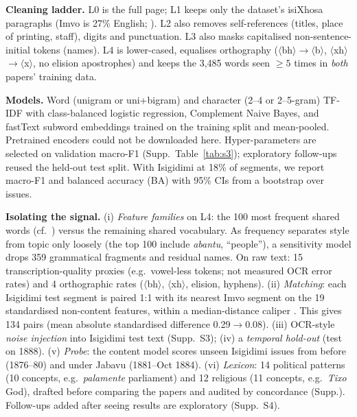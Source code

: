 \documentclass[10pt,letterpaper]{article}
\newcommand{\grapheme}[1]{$\langle$#1$\rangle$}
\begin{document}
 \textbf{Cleaning ladder.} L0 is the full page; L1 keeps only the dataset's isiXhosa paragraphs (Imvo is 27\% English; \citealp{schoots2023isixhosa}). L2 also removes self-references (titles, place of printing, staff), digits and punctuation. L3 also masks capitalised non-sentence-initial tokens (names). L4 is lower-cased, equalises orthography (\grapheme{bh}$\to$\grapheme{b}, \grapheme{xh}$\to$\grapheme{x}, no elision apostrophes) and keeps the 3{,}485 words seen $\geq5$ times in \emph{both} papers' training data.

 \textbf{Models.} Word (unigram or uni+bigram) and character (2--4 or 2--5-gram) TF-IDF with class-balanced logistic regression, Complement Naive Bayes, and fastText subword embeddings \citep{bojanowski2017enriching} trained on the training split and mean-pooled. Pretrained encoders \citep{alabi2022adapting} could not be downloaded here. Hyper-parameters are selected on validation macro-F1 (Supp.\ Table~\ref{tab:s3}); exploratory follow-ups reused the held-out test split. With Isigidimi at 18\% of segments, we report macro-F1 and balanced accuracy (BA) with 95\% CIs from a bootstrap over issues.

 \textbf{Isolating the signal.} (i) \emph{Feature families} on L4: the 100 most frequent shared words (cf.\ \citealp{mosteller1964inference}) versus the remaining shared vocabulary. As frequency separates style from topic only loosely (the top 100 include \emph{abantu}, ``people''), a sensitivity model drops 359 grammatical fragments and residual names. On raw text: 15 transcription-quality proxies (e.g.\ vowel-less tokens; not measured OCR error rates) and 4 orthographic rates (\grapheme{bh}, \grapheme{xh}, elision, hyphens). (ii) \emph{Matching}: each Isigidimi test segment is paired 1:1 with its nearest Imvo segment on the 19 standardised non-content features, within a median-distance caliper \citep{stuart2010matching}. This gives 134 pairs (mean absolute standardised difference 0.29$\to$0.08). (iii) OCR-style \emph{noise injection} into Isigidimi test text (Supp.\ S3); (iv) a \emph{temporal hold-out} (test on 1888). (v) \emph{Probe}: the content model scores unseen Isigidimi issues from before (1876--80) and under Jabavu (1881--Oct 1884). (vi) \emph{Lexicon}: 14 political patterns (10 concepts, e.g.\ \emph{palamente} parliament) and 12 religious (11 concepts, e.g.\ \emph{Tixo} God), drafted before comparing the papers and audited by concordance (Supp.). Follow-ups added after seeing results are exploratory (Supp.\ S4).
\end{document}
